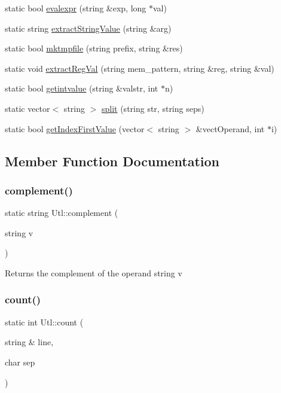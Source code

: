 \begin{DoxyCompactItemize}
static bool \hyperlink{classUtl_a299e81b7065a844d70939d287be40e9a}{evalexpr} (string \&exp, long $\ast$val)
\item 
static string \hyperlink{classUtl_ab5e45ebcf3f1ae1b877c1d0ce274803a}{extract\+String\+Value} (string \&arg)
\item 
static bool \hyperlink{classUtl_a1f2b58b4443642b1102176d5a9cbd701}{mktmpfile} (string prefix, string \&res)
\item 
static void \hyperlink{classUtl_a957cf4b41bffc4ceacaf115397973472}{extract\+Reg\+Val} (string mem\+\_\+pattern, string \&reg, string \&val)
\item 
static bool \hyperlink{classUtl_ab2ade6c1ce649f2540a5695e1f07beb7}{getintvalue} (string \&valstr, int $\ast$n)
\item 
static vector$<$ string $>$ \hyperlink{classUtl_a02229754bf5fe1d8ecd4e84433cb778d}{split} (string str, string seps)
\item 
static bool \hyperlink{classUtl_a0a5af3a4ae8af28de9d536de731d86af}{get\+Index\+First\+Value} (vector$<$ string $>$ \&vect\+Operand, int $\ast$i)
\end{DoxyCompactItemize}


\subsection{Member Function Documentation}
\mbox{\label{classUtl_adfb7a7b2da6909b23d167047ef950438}} 
\subsubsection{\texorpdfstring{complement()}{complement()}}
{\footnotesize\ttfamily static string Utl\+::complement (\begin{DoxyParamCaption}\item[{string}]{v }\end{DoxyParamCaption})\hspace{0.3cm}{\ttfamily [static]}}

\begin{DoxyReturn}{Returns}
the complement of the operand string v 
\end{DoxyReturn}
\mbox{\label{classUtl_a578a26ee8b9ee68d6759874765b6ffd3}} 
\subsubsection{\texorpdfstring{count()}{count()}}
{\footnotesize\ttfamily static int Utl\+::count (\begin{DoxyParamCaption}\item[{string \&}]{line,  }\item[{char}]{sep }\end{DoxyParamCaption})\hspace{0.3cm}{\ttfamily [static]}}

